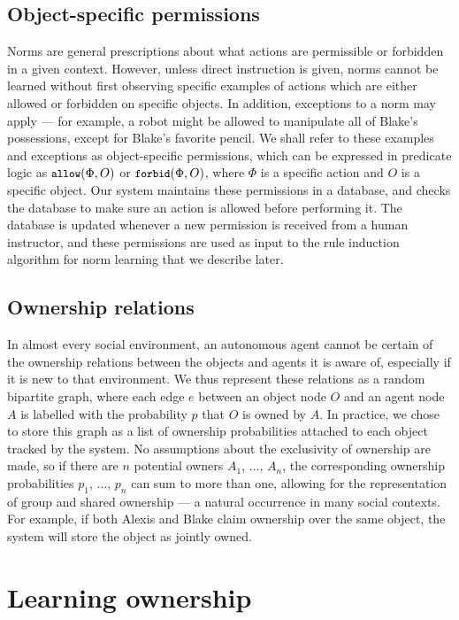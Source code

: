 \documentclass[letterpaper]{article} %
\begin{document}
\subsection{Object-specific permissions}

Norms are general prescriptions about what actions are permissible or forbidden in a given context. However, unless direct instruction is given, norms cannot be learned without first observing specific examples of actions which are either allowed or forbidden on specific objects. In addition, exceptions to a norm may apply --- for example, a robot might be allowed to manipulate all of Blake's possessions, except for Blake's favorite pencil. We shall refer to these examples and exceptions as object-specific permissions, which can be expressed in predicate logic as $\small\texttt{allow}(\Phi, O)$ or $\small\texttt{forbid}(\Phi, O)$, where $\Phi$ is a specific action and $O$ is a specific object. Our system maintains these permissions in a database, and checks the database to make sure an action is allowed before performing it. The database is updated whenever a new permission is received from a human instructor, and these permissions are used as input to the rule induction algorithm for norm learning that we describe later.

\subsection{Ownership relations}

In almost every social environment, an autonomous agent cannot be certain of the ownership relations between the objects and agents it is aware of, especially if it is new to that environment. We thus represent these relations as a random bipartite graph, where each edge $e$ between an object node $O$ and an agent node $A$ is labelled with the probability $p$ that $O$ is owned by $A$. In practice, we chose to store this graph as a list of ownership probabilities attached to each object tracked by the system. No assumptions about the exclusivity of ownership are made, so if there are $n$ potential owners $A_1$, ..., $A_n$, the corresponding ownership probabilities $p_1$, ..., $p_n$ can sum to more than one, allowing for the representation of group and shared ownership --- a natural occurrence in many social contexts. For example, if both Alexis and Blake claim ownership over the same object, the system will store the object  as jointly owned.

\section{Learning ownership}
\end{document}
